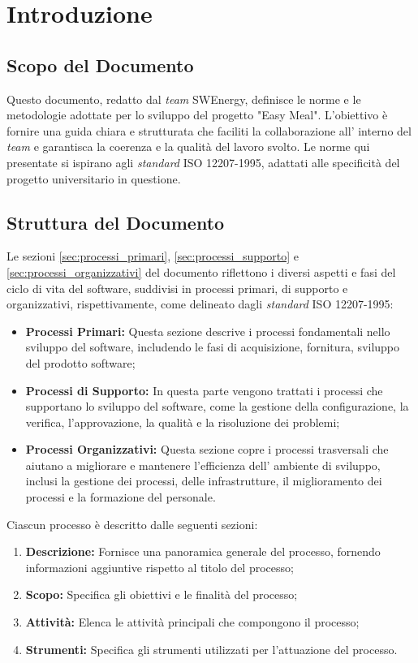 \section{Introduzione}

\subsection{Scopo del Documento}
Questo documento, redatto dal \textit{team} SWEnergy, definisce le norme e le
metodologie adottate per lo sviluppo del progetto "Easy Meal". L'obiettivo è
fornire una guida chiara e strutturata che faciliti la collaborazione all'
interno del \textit{team} e garantisca la coerenza e la qualità del lavoro svolto. Le
norme qui presentate si ispirano agli \textit{standard} ISO 12207-1995, adattati alle
specificità del progetto universitario in questione.

\subsection{Struttura del Documento}
Le sezioni \cref{sec:processi_primari}, \cref{sec:processi_supporto} e \cref{sec:processi_organizzativi} del documento riflettono i diversi aspetti e fasi del ciclo di vita del software, suddivisi in processi primari, di supporto e organizzativi, rispettivamente, come delineato dagli \textit{standard} ISO 12207-1995:

\begin{itemize}
	\item \textbf{Processi Primari:} Questa sezione descrive i processi
	      fondamentali nello sviluppo del software, includendo le fasi di
	      acquisizione, fornitura, sviluppo del prodotto software;
	\item \textbf{Processi di Supporto:} In questa parte vengono trattati i
	      processi che supportano lo sviluppo del software, come la gestione
	      della configurazione, la verifica, l'approvazione, la qualità e la
	      risoluzione dei problemi;
	\item \textbf{Processi Organizzativi:} Questa sezione copre i processi
	      trasversali che aiutano a migliorare e mantenere l'efficienza dell'
	      ambiente di sviluppo, inclusi la gestione dei processi, delle
	      infrastrutture, il miglioramento dei processi e la formazione del
	      personale.
\end{itemize}

Ciascun processo è descritto dalle seguenti sezioni:
\begin{enumerate}
	\item \textbf{Descrizione:} Fornisce una panoramica generale del processo,
	      fornendo informazioni aggiuntive rispetto al titolo del processo;
	\item \textbf{Scopo:} Specifica gli obiettivi e le finalità del processo;
	\item \textbf{Attività:} Elenca le attività principali che compongono il
	      processo;
	\item \textbf{Strumenti:} Specifica gli strumenti utilizzati per
	      l'attuazione del processo.
\end{enumerate}

